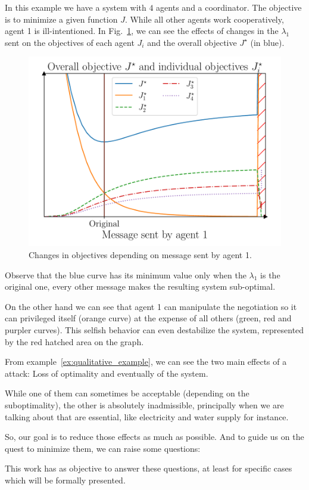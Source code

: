 \documentclass[../main.tex]{subfiles}
\begin{document}
\begin{example}
In this example we have a system with $4$ agents and a coordinator. The objective is to minimize a given function $J$. While all other agents work cooperatively, agent 1 is ill-intentioned. In Fig.~\ref{fig:change_in_j}, we can see the effects of changes in the $\lambda_{1}$ sent on the objectives of each agent $J_{i}$ and the overall objective $J^{\star}$ (in blue).
  \begin{figure}[H]
    \centering
    \includegraphics[width=.5\textwidth]{../img/qualitative_example.pdf}
    \caption{Changes in objectives depending on message sent by agent 1.}\label{fig:change_in_j}
  \end{figure}
  Observe that the blue curve has its minimum value only when the $\lambda_{1}$ is the original one, every other message makes the resulting system sub-optimal.

  On the other hand we can see that agent 1 can manipulate the negotiation so it can privileged itself (orange curve) at the expense of all others (green, red and purpler curves). This selfish behavior can even destabilize the system, represented by the red hatched area on the graph.
\end{example}

From example~\ref{ex:qualitative_example}, we can see the two main effects of a attack: Loss of optimality and eventually  of the system.

While one of them can sometimes be acceptable (depending on the suboptimality), the other is absolutely inadmissible, principally when we are talking about \cps{} that are essential, like electricity and water supply for instance.

So, our goal is to reduce those effects as much as possible.
And to guide us on the quest to minimize them, we can raise some questions:

This work has as objective to answer these questions, at least for specific cases which will be formally presented.
\end{document}
